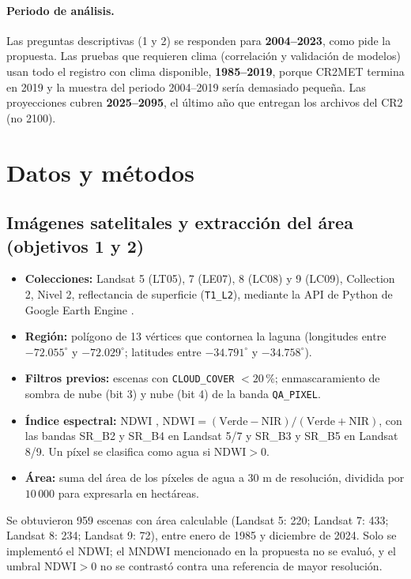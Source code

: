 \documentclass[11pt,a4paper]{article}
\begin{document}
\paragraph{Periodo de análisis.} Las preguntas descriptivas (1 y 2) se responden para \textbf{2004--2023}, como pide la propuesta. Las pruebas que requieren clima (correlación y validación de modelos) usan todo el registro con clima disponible, \textbf{1985--2019}, porque CR2MET termina en 2019 y la muestra del periodo 2004--2019 sería demasiado pequeña. Las proyecciones cubren \textbf{2025--2095}, el último año que entregan los archivos del CR2 (no 2100).

\section{Datos y métodos}

\subsection{Imágenes satelitales y extracción del área (objetivos 1 y 2)}

\begin{itemize}
\item \textbf{Colecciones:} Landsat 5 (LT05), 7 (LE07), 8 (LC08) y 9 (LC09), Collection 2, Nivel 2, reflectancia de superficie (\texttt{T1\_L2}), mediante la API de Python de Google Earth Engine \cite{gorelick2017}.
\item \textbf{Región:} polígono de 13 vértices que contornea la laguna (longitudes entre $-72.055^\circ$ y $-72.029^\circ$; latitudes entre $-34.791^\circ$ y $-34.758^\circ$).
\item \textbf{Filtros previos:} escenas con \texttt{CLOUD\_COVER} $<20\,\%$; enmascaramiento de sombra de nube (bit 3) y nube (bit 4) de la banda \texttt{QA\_PIXEL}.
\item \textbf{Índice espectral:} NDWI \cite{mcfeeters1996}, $\text{NDWI}=(\text{Verde}-\text{NIR})/(\text{Verde}+\text{NIR})$, con las bandas SR\_B2 y SR\_B4 en Landsat 5/7 y SR\_B3 y SR\_B5 en Landsat 8/9. Un píxel se clasifica como agua si $\text{NDWI}>0$.
\item \textbf{Área:} suma del área de los píxeles de agua a 30 m de resolución, dividida por $10\,000$ para expresarla en hectáreas.
\end{itemize}
Se obtuvieron 959 escenas con área calculable (Landsat 5: 220; Landsat 7: 433; Landsat 8: 234; Landsat 9: 72), entre enero de 1985 y diciembre de 2024. Solo se implementó el NDWI; el MNDWI mencionado en la propuesta no se evaluó, y el umbral $\text{NDWI}>0$ no se contrastó contra una referencia de mayor resolución.
\end{document}
